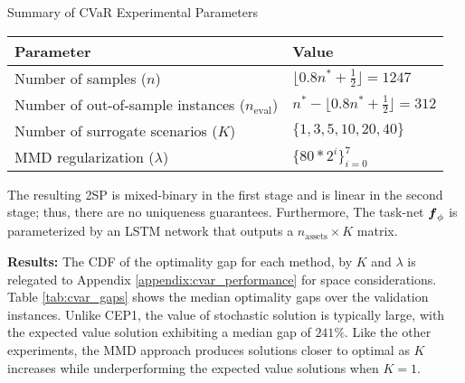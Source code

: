 \begin{table}[h]
    \TABLE
    {Summary of CVaR Experimental Parameters \label{tab:CVaR_parameters}}
    {\begin{tabular}{ll}
        \toprule
        \textbf{Parameter} & \textbf{Value} \\
        \midrule
        Number of samples ($n$) & $\lfloor{0.8n^* +\frac{1}{2}}\rfloor = 1247$\\
        Number of out-of-sample instances ($n_{\text{eval}}$) & $n^* - \lfloor{0.8n^* +\frac{1}{2}}\rfloor = 312$ \\
        Number of surrogate scenarios ($K$) & $\{1, 3, 5, 10, 20, 40\}$ \\
        MMD regularization ($\lambda$) & $\{80*2^{i}\}_{i=0}^7$ \\
        \bottomrule
        \end{tabular}}{}
    \end{table}


The resulting 2SP is mixed-binary in the first stage and is linear in the second stage; thus, there are no uniqueness guarantees. Furthermore, The task-net $\boldsymbol{f}_{\phi}$ is parameterized by an LSTM network that outputs a \hbox{$n_{\text{assets}} \times K$} matrix.



\vspace{\littlespace}
\noindent \textbf{Results:} The CDF of the optimality gap for each method, by $K$ and $\lambda$ is relegated to Appendix \ref{appendix:cvar_performance} for space considerations. Table \ref{tab:cvar_gaps} shows the median optimality gaps over the validation instances. Unlike CEP1, the value of stochastic solution is typically large, with the expected value solution exhibiting a median gap of $241\%$. Like the other experiments, the MMD approach produces solutions closer to optimal as $K$ increases while underperforming the expected value solutions when $K=1$.

